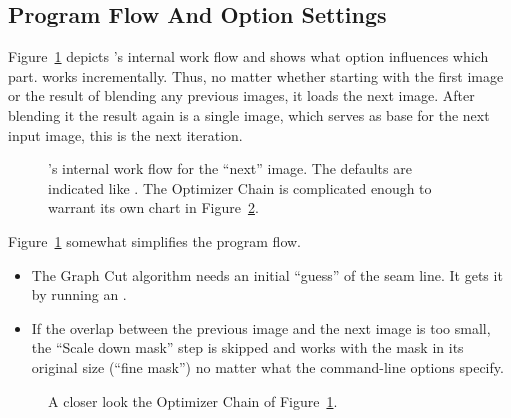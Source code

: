 

\subsection[Program Flow Charts]{Program Flow And Option Settings
  \label{sec:program-flow-and-option-settings}
  }

Figure~\ref{fig:internal-enblend-flow} depicts \App's internal work
flow and shows what option influences
which part.  \App{} works incrementally.  Thus, no matter whether
starting with the first image or the result of blending any previous
images, it loads the next image.  After blending it the result again
is a single image, which serves as base for the next input image, this
is the next iteration.

\begin{figure}[htbp]
  \begin{maxipage}
    \centering

    \caption[Internal work flow]{\App's internal work flow for the
      ``next'' image.  The defaults are indicated like \sample{[default]}.
      The Optimizer Chain is complicated enough to warrant its own
      chart in
      Figure~\ref{fig:internal-optimizer-chain}.}\label{fig:internal-enblend-flow}
  \end{maxipage}
\end{figure}

\begin{geeknote}
  Figure~\ref{fig:internal-enblend-flow} somewhat simplifies the
  program flow.

  \begin{itemize}
  \item
    The Graph Cut algorithm needs an initial ``guess'' of the seam
    line.  It gets it by running an .

  \item
    If the overlap between the previous image and the next image is
    too small, the ``Scale down mask'' step is skipped and \App{}
    works with the mask in its original size (``fine mask'') no matter
    what the command-line options specify.
  \end{itemize}
\end{geeknote}

\begin{figure}[htbp]
  \begin{maxipage}
    \centering

    \caption[Optimizer chain]{A closer look the Optimizer Chain of
      Figure~\ref{fig:internal-enblend-flow}.}\label{fig:internal-optimizer-chain}
  \end{maxipage}
\end{figure}

